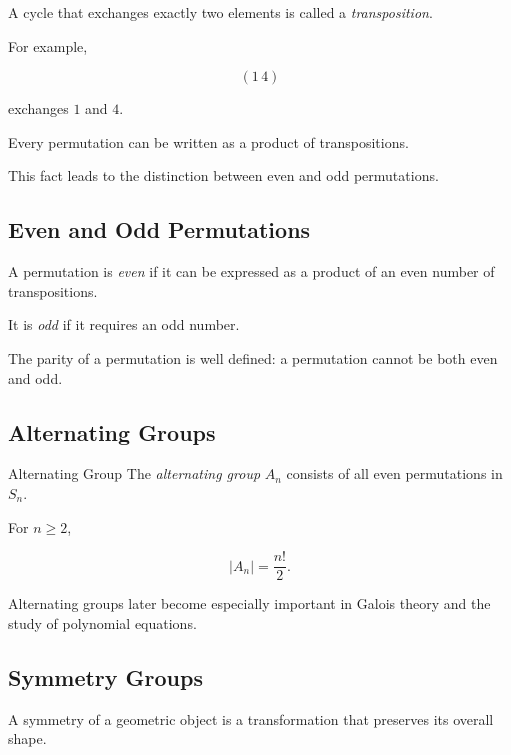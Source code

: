 A cycle that exchanges exactly two elements is called a
\emph{transposition}.

For example,

\[ (1\,4) \]

exchanges \(1\) and \(4\).

Every permutation can be written as a product of transpositions.

This fact leads to the distinction between even and odd permutations.

\subsection{Even and Odd Permutations}
\label{subsec:even-odd-permutations}

A permutation is \emph{even} if it can be expressed as a product of an even
number of transpositions.

It is \emph{odd} if it requires an odd number.

The parity of a permutation is well defined: a permutation cannot be both
even and odd.

\subsection{Alternating Groups}
\label{subsec:alternating-groups}

\begin{definitionbox}{Alternating Group}
The \emph{alternating group} \(A_n\) consists of all even permutations in
\(S_n\).
\end{definitionbox}

For \(n\geq2\),

\[ |A_n|=\frac{n!}{2}. \]

Alternating groups later become especially important in Galois theory and the
study of polynomial equations.

\subsection{Symmetry Groups}
\label{subsec:symmetry-groups}

A symmetry of a geometric object is a transformation that preserves its
overall shape.

